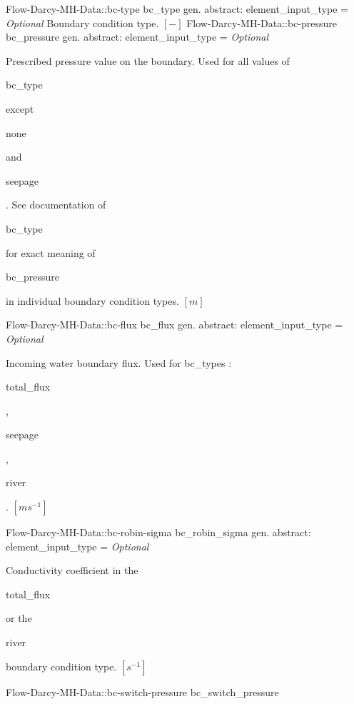 \begin{RecordType}
{{}}
		\RecKey
			{Flow-Darcy-MH-Data::bc-type}
			{bc{\_}type}
			{{gen. abstract: }}{{element{\_}input{\_}type}{ = }}
			{ \it{Optional}}
			{{{Boundary condition type. }{$[-]$}%
}}
		\RecKey
			{Flow-Darcy-MH-Data::bc-pressure}
			{bc{\_}pressure}
			{{gen. abstract: }}{{element{\_}input{\_}type}{ = }}
			{ \it{Optional}}
			{{{Prescribed pressure value on the boundary.
Used for all values of }\begin{ttfamily}bc{\_}type\end{ttfamily}{ except }\begin{ttfamily}none\end{ttfamily}{ and }\begin{ttfamily}seepage\end{ttfamily}{. See documentation of }\begin{ttfamily}bc{\_}type\end{ttfamily}{ for exact meaning of }\begin{ttfamily}bc{\_}pressure\end{ttfamily}{ in individual boundary condition types. }{$[m]$}%
}}
		\RecKey
			{Flow-Darcy-MH-Data::bc-flux}
			{bc{\_}flux}
			{{gen. abstract: }}{{element{\_}input{\_}type}{ = }}
			{ \it{Optional}}
			{{{Incoming water boundary flux.
Used for bc{\_}types : }\begin{ttfamily}total{\_}flux\end{ttfamily}{, }\begin{ttfamily}seepage\end{ttfamily}{, }\begin{ttfamily}river\end{ttfamily}{. }{$[ms^{-1}]$}%
}}
		\RecKey
			{Flow-Darcy-MH-Data::bc-robin-sigma}
			{bc{\_}robin{\_}sigma}
			{{gen. abstract: }}{{element{\_}input{\_}type}{ = }}
			{ \it{Optional}}
			{{{Conductivity coefficient in the }\begin{ttfamily}total{\_}flux\end{ttfamily}{ or the }\begin{ttfamily}river\end{ttfamily}{ boundary condition type. }{$[s^{-1}]$}%
}}
		\RecKey
			{Flow-Darcy-MH-Data::bc-switch-pressure}
			{bc{\_}switch{\_}pressure}

\end{RecordType}
